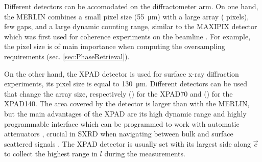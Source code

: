 Different detectors can be accomodated on the diffractometer arm.
On one hand, the MERLIN \parencite{BEWLEY20061029} combines a small pixel size (\qty{55}{\um}) with a large array ( pixels), few gaps, and a large dynamic counting range, similar to the MAXIPIX detector \parencite{ponchut_maxipix_2011} which was first used for coherence experiments on the beamline \parencite{Schavkan2013, Li2020}.
For example, the pixel size is of main importance when computing the oversampling requirements (sec. \ref{sec:PhaseRetrieval}).

On the other hand, the XPAD detector \parencite{Basolo2005, Dawiec_2016} is used for surface x-ray diffraction experiments, its pixel size is equal to \qty{130}{\um}.
Different detectors can be used that change the array size, respectively () for the XPAD70 and () for the XPAD140.
The area covered by the detector is larger than with the MERLIN, but the main advantages of the XPAD are its high dynamic range and highly programmable interface \parencite{Fertey2013} which can be programmed to work with automatic attenuators \parencite{Dawiec_2016}, crucial in SXRD when navigating between bulk and surface scattered signals .
The XPAD detector is usually set with its largest side along $\vec{c}$ to collect the highest range in $l$ during the measurements.